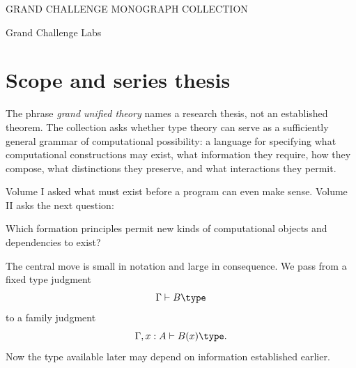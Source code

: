 \documentclass[11pt,openany]{book}
\begin{document}
\frontmatter
\begin{titlepage}
\pagecolor{GCLPale!35}\color{GCLInk}\centering
\vspace*{1.2cm}
{\small\sffamily GRAND CHALLENGE MONOGRAPH COLLECTION\par}
\vspace{1.1cm}{\Huge\bfseries TYPE THEORY\par}
\vspace{0.25cm}{\Large The Grand Unified Theory of Computation\par}
\vspace{1cm}{\color{GCLWarm}\rule{0.76\textwidth}{1.1pt}\par}
\vspace{0.25cm}{\LARGE How Computational Worlds Are Built\par}
\vspace{0.25cm}{\large Volume II\par}
\vfill {\large Grand Challenge Labs\par}
\end{titlepage}
\nopagecolor\color{GCLInk}

\chapter*{Scope and series thesis}
The phrase \emph{grand unified theory} names a research thesis, not an established theorem. The collection asks whether type theory can serve as a sufficiently general grammar of computational possibility: a language for specifying what computational constructions may exist, what information they require, how they compose, what distinctions they preserve, and what interactions they permit.

Volume I asked what must exist before a program can even make sense. Volume II asks the next question:

\begin{principle}
Which formation principles permit new kinds of computational objects and dependencies to exist?
\end{principle}

The central move is small in notation and large in consequence. We pass from a fixed type judgment
\[
  \Gamma\vdash B\type
\]
to a family judgment
\[
  \Gamma,x:A\vdash B(x)\type.
\]
Now the type available later may depend on information established earlier.
\end{document}
